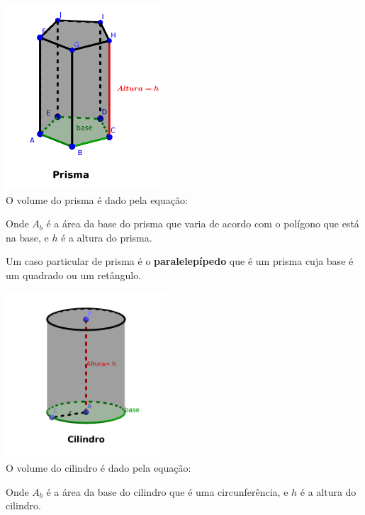 \begin{multicols}{2}
 \includegraphics[width=6cm]{./cap_geometria/figs/prisma_pentagono} \\
 O volume do prisma é dado pela equação:
 

 Onde $A_b$ é a área da base do prisma que varia de acordo com o polígono que está na base, e $h$ é a altura do prisma.

 Um caso particular de prisma é o \textbf{paralelepípedo} que é um prisma cuja base é um quadrado ou um retângulo.
\end{multicols}

\begin{multicols}{2}
 \includegraphics[width=6cm]{./cap_geometria/figs/cilindro} \\
 O volume do cilindro é dado pela equação:
 

 Onde $A_b$ é a área da base do cilindro que é uma circunferência, e $h$ é a altura do cilindro.
\end{multicols}

